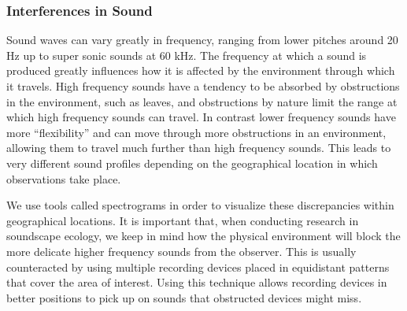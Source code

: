 \subsubsection{Interferences in Sound}
Sound waves can vary greatly in frequency, ranging from lower pitches around 20 Hz up to super sonic sounds at 60 kHz. The frequency at which a sound is produced greatly influences how it is affected by the environment through which it travels. High frequency sounds have a tendency to be absorbed by obstructions in the environment, such as leaves, and obstructions by nature limit the range at which high frequency sounds can travel. In contrast lower frequency sounds have more ``flexibility'' and can move through more obstructions in an environment, allowing them to travel much further than high frequency sounds. This leads to very different sound profiles depending on the geographical location in which observations take place.\par
We use tools called spectrograms in order to visualize these discrepancies within geographical locations. It is important that, when conducting research in soundscape ecology, we keep in mind how the physical environment will block the more delicate higher frequency sounds from the observer. This is usually counteracted by using multiple recording devices placed in equidistant patterns that cover the area of interest. Using this technique allows recording devices in better positions to pick up on sounds that obstructed devices might miss.

